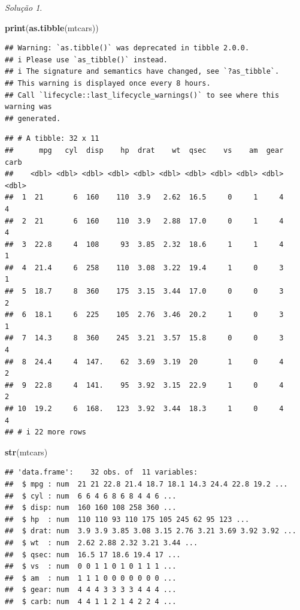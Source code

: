 \documentclass[
]{latex/krantz}
\newenvironment{Shaded}{\begin{snugshade}}{\end{snugshade}}
\newcommand{\FunctionTok}[1]{\textcolor[rgb]{0.13,0.29,0.53}{\textbf{#1}}}
\newcommand{\NormalTok}[1]{#1}
\theoremstyle{definition}
\theoremstyle{definition}
\theoremstyle{definition}
\theoremstyle{definition}
\theoremstyle{remark}
\newtheorem*{solution}{Solução}
\begin{document}
\begin{solution}
\begin{Shaded}
\begin{Highlighting}[]
\FunctionTok{print}\NormalTok{(}\FunctionTok{as.tibble}\NormalTok{(mtcars))}
\end{Highlighting}
\end{Shaded}

\begin{verbatim}
## Warning: `as.tibble()` was deprecated in tibble 2.0.0.
## i Please use `as_tibble()` instead.
## i The signature and semantics have changed, see `?as_tibble`.
## This warning is displayed once every 8 hours.
## Call `lifecycle::last_lifecycle_warnings()` to see where this warning was
## generated.
\end{verbatim}

\begin{verbatim}
## # A tibble: 32 x 11
##      mpg   cyl  disp    hp  drat    wt  qsec    vs    am  gear  carb
##    <dbl> <dbl> <dbl> <dbl> <dbl> <dbl> <dbl> <dbl> <dbl> <dbl> <dbl>
##  1  21       6  160    110  3.9   2.62  16.5     0     1     4     4
##  2  21       6  160    110  3.9   2.88  17.0     0     1     4     4
##  3  22.8     4  108     93  3.85  2.32  18.6     1     1     4     1
##  4  21.4     6  258    110  3.08  3.22  19.4     1     0     3     1
##  5  18.7     8  360    175  3.15  3.44  17.0     0     0     3     2
##  6  18.1     6  225    105  2.76  3.46  20.2     1     0     3     1
##  7  14.3     8  360    245  3.21  3.57  15.8     0     0     3     4
##  8  24.4     4  147.    62  3.69  3.19  20       1     0     4     2
##  9  22.8     4  141.    95  3.92  3.15  22.9     1     0     4     2
## 10  19.2     6  168.   123  3.92  3.44  18.3     1     0     4     4
## # i 22 more rows
\end{verbatim}

\begin{Shaded}
\begin{Highlighting}[]
\FunctionTok{str}\NormalTok{(mtcars)}
\end{Highlighting}
\end{Shaded}

\begin{verbatim}
## 'data.frame':    32 obs. of  11 variables:
##  $ mpg : num  21 21 22.8 21.4 18.7 18.1 14.3 24.4 22.8 19.2 ...
##  $ cyl : num  6 6 4 6 8 6 8 4 4 6 ...
##  $ disp: num  160 160 108 258 360 ...
##  $ hp  : num  110 110 93 110 175 105 245 62 95 123 ...
##  $ drat: num  3.9 3.9 3.85 3.08 3.15 2.76 3.21 3.69 3.92 3.92 ...
##  $ wt  : num  2.62 2.88 2.32 3.21 3.44 ...
##  $ qsec: num  16.5 17 18.6 19.4 17 ...
##  $ vs  : num  0 0 1 1 0 1 0 1 1 1 ...
##  $ am  : num  1 1 1 0 0 0 0 0 0 0 ...
##  $ gear: num  4 4 4 3 3 3 3 4 4 4 ...
##  $ carb: num  4 4 1 1 2 1 4 2 2 4 ...
\end{verbatim}


\end{solution}
\end{document}
